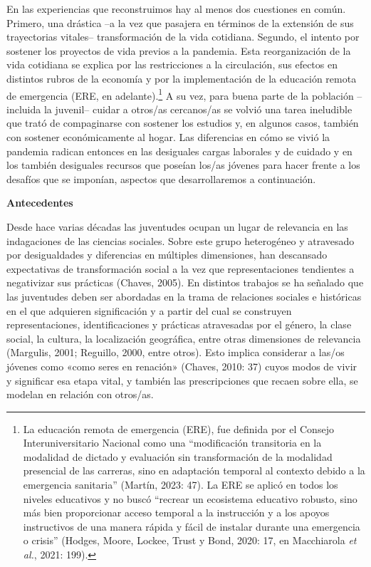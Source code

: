 En las experiencias que reconstruimos hay al menos dos cuestiones en común. Primero, una drástica --a la vez que pasajera en términos de la extensión de sus trayectorias vitales-- transformación de la vida cotidiana. Segundo, el intento por sostener los proyectos de vida previos a la pandemia. Esta reorganización de la vida cotidiana se explica por las restricciones a la circulación, sus efectos en distintos rubros de la economía y por la implementación de la educación remota de emergencia (ERE, en adelante).\footnote{La educación remota de emergencia (ERE), fue definida por el Consejo Interuniversitario Nacional como una ``modificación transitoria en la modalidad de dictado y evaluación sin transformación de la modalidad presencial de las carreras, sino en adaptación temporal al contexto debido a la emergencia sanitaria'' (Martín, 2023: 47). La ERE se aplicó en todos los niveles educativos y no buscó ``recrear un ecosistema educativo robusto, sino más bien proporcionar acceso temporal a la instrucción y a los apoyos instructivos de una manera rápida y fácil de instalar durante una emergencia o crisis'' (Hodges, Moore, Lockee, Trust y Bond, 2020: 17, en Macchiarola \emph{et al.}, 2021: 199).} A su vez, para buena parte de la población --incluida la juvenil-- cuidar a otros/as cercanos/as se volvió una tarea ineludible que trató de compaginarse con sostener los estudios y, en algunos casos, también con sostener económicamente al hogar. Las diferencias en cómo se vivió la pandemia radican entonces en las desiguales cargas laborales y de cuidado y en los también desiguales recursos que poseían los/as jóvenes para hacer frente a los desafíos que se imponían, aspectos que desarrollaremos a continuación.

\textbf{Antecedentes}

Desde hace varias décadas las juventudes ocupan un lugar de relevancia en las indagaciones de las ciencias sociales. Sobre este grupo heterogéneo y atravesado por desigualdades y diferencias en múltiples dimensiones, han descansado expectativas de transformación social a la vez que representaciones tendientes a negativizar sus prácticas (Chaves, 2005). En distintos trabajos se ha señalado que las juventudes deben ser abordadas en la trama de relaciones sociales e históricas en el que adquieren significación y a partir del cual se construyen representaciones, identificaciones y prácticas atravesadas por el género, la clase social, la cultura, la localización geográfica, entre otras dimensiones de relevancia (Margulis, 2001; Reguillo, 2000, entre otros). Esto implica considerar a las/os jóvenes como «como seres en renación» (Chaves, 2010: 37) cuyos modos de vivir y significar esa etapa vital, y también las prescripciones que recaen sobre ella, se modelan en relación con otros/as.

